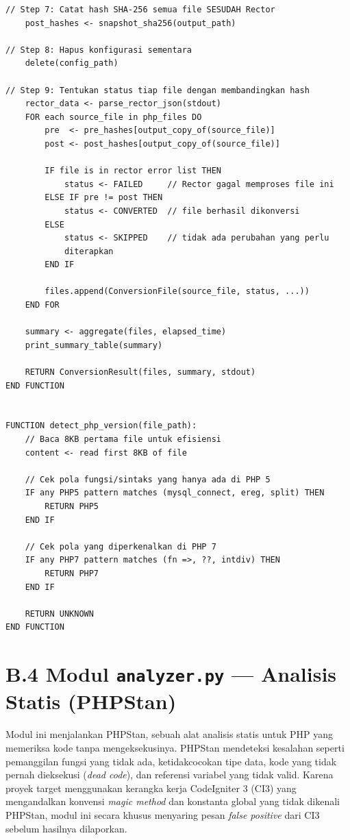 \begin{lstlisting}[style=pseudocodestyle]
// Step 7: Catat hash SHA-256 semua file SESUDAH Rector
    post_hashes <- snapshot_sha256(output_path)

// Step 8: Hapus konfigurasi sementara
    delete(config_path)

// Step 9: Tentukan status tiap file dengan membandingkan hash
    rector_data <- parse_rector_json(stdout)
    FOR each source_file in php_files DO
        pre  <- pre_hashes[output_copy_of(source_file)]
        post <- post_hashes[output_copy_of(source_file)]

        IF file is in rector error list THEN
            status <- FAILED     // Rector gagal memproses file ini
        ELSE IF pre != post THEN
            status <- CONVERTED  // file berhasil dikonversi
        ELSE
            status <- SKIPPED    // tidak ada perubahan yang perlu 
            diterapkan
        END IF

        files.append(ConversionFile(source_file, status, ...))
    END FOR

    summary <- aggregate(files, elapsed_time)
    print_summary_table(summary)

    RETURN ConversionResult(files, summary, stdout)
END FUNCTION


FUNCTION detect_php_version(file_path):
    // Baca 8KB pertama file untuk efisiensi
    content <- read first 8KB of file

    // Cek pola fungsi/sintaks yang hanya ada di PHP 5
    IF any PHP5 pattern matches (mysql_connect, ereg, split) THEN
        RETURN PHP5
    END IF

    // Cek pola yang diperkenalkan di PHP 7
    IF any PHP7 pattern matches (fn =>, ??, intdiv) THEN
        RETURN PHP7
    END IF

    RETURN UNKNOWN
END FUNCTION
\end{lstlisting}

\section*{B.4 Modul \texttt{analyzer.py} --- Analisis Statis (PHPStan)}

Modul ini menjalankan PHPStan, sebuah alat analisis statis untuk PHP yang
memeriksa kode tanpa mengeksekusinya. PHPStan mendeteksi kesalahan seperti
pemanggilan fungsi yang tidak ada, ketidakcocokan tipe data, kode yang tidak
pernah dieksekusi (\textit{dead code}), dan referensi variabel yang tidak valid.
Karena proyek target menggunakan kerangka kerja CodeIgniter 3 (CI3) yang
mengandalkan konvensi \textit{magic method} dan konstanta global yang tidak
dikenali PHPStan, modul ini secara khusus menyaring pesan \textit{false positive}
dari CI3 sebelum hasilnya dilaporkan.

